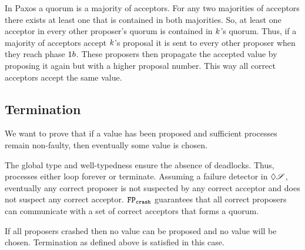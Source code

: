 In Paxos a quorum is a majority of acceptors.
For any two majorities of acceptors there exists at least one that is contained in both majorities.
So, at least one acceptor in every other proposer's quorum is contained in $k$'s quorum.
Thus, if a majority of acceptors accept $k$'s proposal it is sent to every other proposer when they reach phase $1b$.
These proposers then propagate the accepted value by proposing it again but with a higher proposal number.
This way all correct acceptors accept the same value.

\subsection{Termination}

We want to prove that if a value has been proposed and sufficient processes remain non-faulty, then eventually some value is chosen.

The global type and well-typedness ensure the absence of deadlocks.
Thus, processes either loop forever or terminate.
Assuming a failure detector in $\Diamond\mathscr{S}$, eventually any correct proposer is not suspected by any correct acceptor and does not suspect any correct acceptor.
$\mathtt{FP_{crash}}$ guarantees that all correct proposers can communicate with a set of correct acceptors that forms a quorum.

If all proposers crashed then no value can be proposed and no value will be chosen.
Termination as defined above is satisfied in this case.

